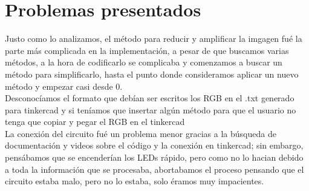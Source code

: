 \documentclass{article}
\begin{document}
\section{Problemas presentados}
Justo como lo analizamos, el método para reducir y amplificar la imgagen fué la parte más complicada en la implementación, a pesar de que buscamos varias métodos, a la hora de codificarlo se complicaba y comenzamos a buscar un método para simplificarlo, hasta el punto donde consideramos aplicar un nuevo método y empezar casi desde 0.\\

Desconocíamos el formato que debían ser escritos los RGB en el .txt generado para tinkercad y si teníamos que insertar algún método para que el usuario no tenga que copiar y pegar el RGB en el tinkercad\\

La conexión del circuito fué un problema menor gracias a la búsqueda de documentación y videos sobre el código y la conexión en tinkercad; sin embargo, pensábamos que se encenderían los LEDs rápido, pero como no lo hacian debido a toda la información que se procesaba, abortabamos el proceso pensando que el circuito estaba malo, pero no lo estaba, solo éramos muy impacientes. 
\end{document}
